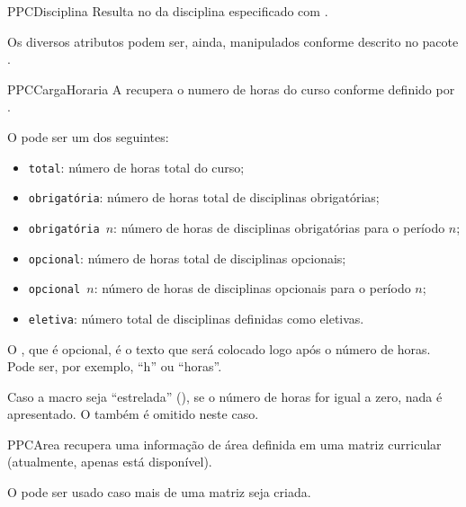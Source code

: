 \documentclass[a4paper, 11pt]{article}
\begin{document}
\begin{Macrodef}{PPCDisciplina}{}{}
    Resulta no  da disciplina  especificado com .
\end{Macrodef}


Os diversos atributos podem ser, ainda, manipulados conforme descrito no pacote .

\begin{Macrodef}{PPCCargaHoraria}{}{}
    A  recupera o numero de horas do curso conforme definido por .

    O  pode ser um dos seguintes:
    \begin{itemize}
        \item \texttt{total}: número de horas total do curso;
        \item \texttt{obrigatória}: número de horas total de disciplinas obrigatórias;
        \item \texttt{obrigatória $n$}: número de horas de disciplinas obrigatórias para o período $n$;
        \item \texttt{opcional}: número de horas total de disciplinas opcionais;
        \item \texttt{opcional $n$}: número de horas de disciplinas opcionais para o período $n$;
        \item \texttt{eletiva}: número total de disciplinas definidas como eletivas.
    \end{itemize}

    O , que é opcional, é o texto que será colocado logo após o número de horas. Pode ser, por exemplo, ``\Macro{,}h'' ou ``\PDTilde horas''.

    Caso a macro seja ``estrelada'' (), se o número de horas for igual a zero, nada é apresentado. O  também é omitido neste caso.
\end{Macrodef}

\begin{Macrodef}{PPCArea}{}{}
     recupera uma informação de área  definida em uma matriz curricular (atualmente, apenas  está disponível).

    O  pode ser usado caso mais de uma matriz seja criada.
\end{Macrodef}
\end{document}
